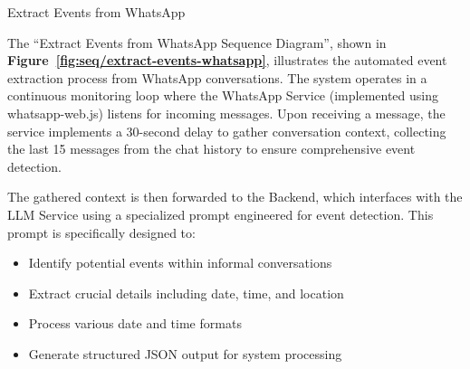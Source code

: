 \begin{usecase}{Extract Events from WhatsApp}
{\begin{itemize}
    \end{itemize}
  }
\end{usecase}

The ``Extract Events from WhatsApp Sequence Diagram'', shown in \textbf{Figure~\ref{fig:seq/extract-events-whatsapp}}, illustrates the automated event extraction process from WhatsApp conversations. The system operates in a continuous monitoring loop where the WhatsApp Service (implemented using whatsapp-web.js) listens for incoming messages. Upon receiving a message, the service implements a 30-second delay to gather conversation context, collecting the last 15 messages from the chat history to ensure comprehensive event detection.

The gathered context is then forwarded to the Backend, which interfaces with the LLM Service using a specialized prompt engineered for event detection. This prompt is specifically designed to:
\begin{itemize}
  \item Identify potential events within informal conversations
  \item Extract crucial details including date, time, and location
  \item Process various date and time formats
  \item Generate structured JSON output for system processing
\end{itemize}

